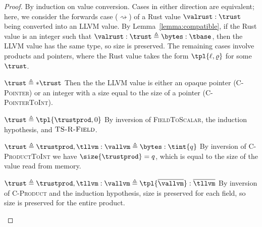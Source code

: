 \begin{proof} By induction on value conversion. Cases in either direction are equivalent; here, we consider the forwards case ($\rightsquigarrow$) of a Rust value $\valrust:\trust$ being converted into an LLVM value. 
By Lemma~\ref{lemma:compatible}, if the Rust value is an integer such that $\valrust:\trust \triangleq \bytes:\tbase$, then the LLVM value has the same type, so size is preserved. 
The remaining cases involve products and pointers, where the Rust value takes the form $\tpl{\ell, \varrho}$ for some $\trust$.
\begin{bycases}
\begin{case}{$\trust \triangleq *\trust$}
Then the the LLVM value is either an opaque pointer (\textsc{C-Pointer}) or an integer with a size equal to the size of a pointer (\textsc{C-PointerToInt}).
\end{case}
\begin{case}{$\trust \triangleq \tpl{\trustprod, 0}$}
By inversion of \textsc{FieldToScalar}, the induction hypothesis, and $\textsc{TS-R-Field}$.
\end{case}
\begin{case}{$\trust \triangleq \trustprod, \tllvm:\vallvm \triangleq \bytes:\tint{q}$}
By inversion of \textsc{C-ProductToInt} we have $\size{\trustprod} = q$, which is equal to the size of the value read from memory. 
\end{case}
\begin{case}{$\trust \triangleq \trustprod, \tllvm:\vallvm \triangleq \tpl{\overline{\vallvm}}:\overline{\tllvm}$}
By inversion of \textsc{C-Product} and the induction hypothesis, size is preserved for each field, so size is preserved for the entire product.
\end{case}
\end{bycases}
\end{proof}